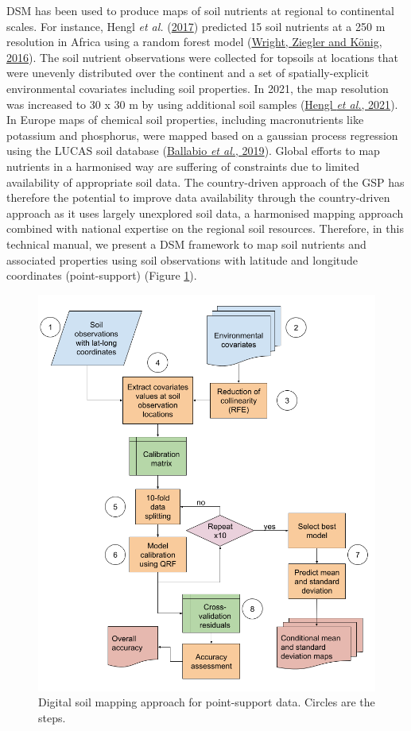 \documentclass[
  10pt,
  b5paper,
  oneside]{book}
\begin{document}
DSM has been used to produce maps of soil nutrients at regional to continental scales. For instance, Hengl \emph{et al.} (\protect\hyperlink{ref-Hengl2017}{2017}) predicted 15 soil nutrients at a 250 m resolution in Africa using a random forest model (\protect\hyperlink{ref-wright2016}{Wright, Ziegler and König, 2016}). The soil nutrient observations were collected for topsoils at locations that were unevenly distributed over the continent and a set of spatially-explicit environmental covariates including soil properties. In 2021, the map resolution was increased to 30 x 30 m by using additional soil samples (\protect\hyperlink{ref-hengl2021}{Hengl \emph{et al.}, 2021}).
In Europe maps of chemical soil properties, including macronutrients like potassium and phosphorus, were mapped based on a gaussian process regression using the LUCAS soil database (\protect\hyperlink{ref-ballabio2019}{Ballabio \emph{et al.}, 2019}).
Global efforts to map nutrients in a harmonised way are suffering of constraints due to limited availability of appropriate soil data. The country-driven approach of the GSP has therefore the potential to improve data availability through the country-driven approach as it uses largely unexplored soil data, a harmonised mapping approach combined with national expertise on the regional soil resources. Therefore, in this technical manual, we present a DSM framework to map soil nutrients and associated properties using soil observations with latitude and longitude coordinates (point-support) (Figure \ref{fig:workflow1}).

\begin{figure}
\includegraphics[width=11.36in]{images/workflow_lat_long_data} \caption{Digital soil mapping approach for point-support data. Circles are the steps.}\label{fig:workflow1}
\end{figure}
\end{document}
